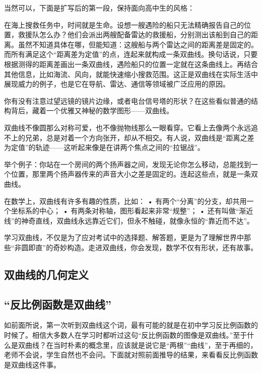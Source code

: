 
\begin{issues}
\issueDraft
\end{issues}


当然可以，下面是扩写后的第一段，保持面向高中生的风格：

在海上搜救任务中，时间就是生命。设想一艘遇险的船只无法精确报告自己的位置，救援队怎么办？他们会派出两艘配备雷达的救援船，分别测出该船到自己的距离。虽然不知道具体在哪，但能知道：这艘船与两个雷达之间的距离差是固定的。而所有满足这个“距离差为定值”的点，连起来就构成一条双曲线。换句话说，只要根据测得的距离差画出一条双曲线，遇险船只的位置一定就在这条曲线上。再结合其他信息，比如海流、风向，就能快速缩小搜救范围。这正是双曲线在实际生活中展现威力的例子，也是它在导航、雷达、通信等领域被广泛应用的原因。


你有没有注意过望远镜的镜片边缘，或者电台信号塔的形状？在这些看似普通的结构背后，藏着一个优雅又神秘的数学图形——双曲线。

双曲线不像圆那么对称可爱，也不像抛物线那么一眼看穿。它看上去像两个永远追不上的兄弟，总是对着一个方向张开，却从不相交。有人说，双曲线是“距离之差为定值”的轨迹——这听起来像是在讲两个焦点之间的“拉锯战”。

举个例子：你站在一个房间的两个扬声器之间，发现无论你怎么移动，总能找到一个位置，那里两个扬声器传来的声音大小之差是固定的。连起这些点，就是一条双曲线。

在数学上，双曲线有许多有趣的性质，比如：
	•	有两个“分离”的分支，却共用一个坐标系的中心；
	•	有两条对称轴，图形看起来非常“规整”；
	•	还有叫做“渐近线”的神奇直线，双曲线永远靠近它们，但永不触碰，就像永恒的“靠近而不达”。

学习双曲线，不仅是为了应对考试中的选择题、解答题，更是为了理解世界中那些“非圆即直”的奇妙构造。走进双曲线，你会发现，数学不仅有形状，还有故事。

\subsection{双曲线的几何定义}

\subsection{“反比例函数是双曲线”}

如前面所说，第一次听到双曲线这个词，最有可能的就是在初中学习反比例函数的时候了。相信大多数人在学习时都听过这句“反比例函数的图像是双曲线。”至于什么是双曲线？在当时朴素的概念里，应该就是说它是“两根”“曲线”，至于再细的，老师不会说，学生自然也不会问。下面就对照前面推导的结果，来看看反比例函数是双曲线这件事。

